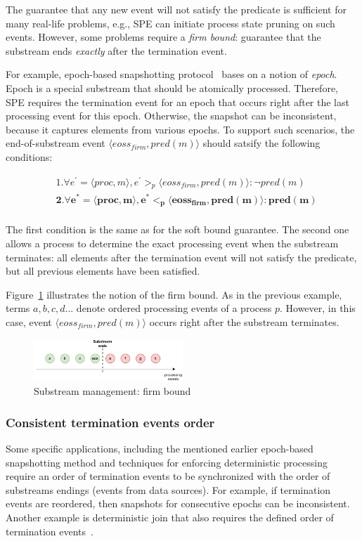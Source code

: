 The guarantee that any new event will not satisfy the predicate is sufficient for many real-life problems, e.g., SPE can initiate process state pruning on such events. However, some problems require a {\em firm bound}: guarantee that the substream ends {\em exactly} after the termination event. 

For example, epoch-based snapshotting protocol~\cite{2015arXiv150608603C, jacques2016consistent} bases on a notion of {\em epoch}. Epoch is a special substream that should be atomically processed. Therefore, SPE requires the termination event for an epoch that occurs right after the last processing event for this epoch. Otherwise, the snapshot can be inconsistent, because it captures elements from various epochs. To support such scenarios, the end-of-substream event $\langle eoss_{firm}, pred(m)\rangle$ should satsify the following conditions:

\begin{align*}
&1. \forall e^{'} = \langle proc,m\rangle, e^{'} >_p \langle eoss_{firm}, pred(m)\rangle : \neg pred(m) \\
&\boldsymbol{2. \forall e^{*} = \langle proc,m\rangle, e^{*} <_p \langle eoss_{firm}, pred(m)\rangle : pred(m)} \\
\end{align*}

The first condition is the same as for the soft bound guarantee. The second one allows a process to determine the exact processing event when the substream terminates: all elements after the termination event will not satisfy the predicate, but all previous elements have been satisfied. 

Figure~\ref{strict_guarantees} illustrates the notion of the firm bound. As in the previous example, terms $a,b,c,d...$ denote ordered processing events of a process $p$. However, in this case, event $\langle eoss_{firm}, pred(m)\rangle$ occurs right after the substream terminates.

\begin{figure}[htbp]
  \centering
  \includegraphics[width=0.50\textwidth]{pics/strict-guarantee.pdf}
  \caption{Substream management: firm bound}
  \label{strict_guarantees}
\end{figure}

\subsubsection{Consistent termination events order}
Some specific applications, including the mentioned earlier epoch-based snapshotting method and techniques for enforcing deterministic processing~\cite{we2018adbis} require an order of termination events to be synchronized with the order of substreams endings (events from data sources). For example, if termination events are reordered, then snapshots for consecutive epochs can be inconsistent. Another example is deterministic join that also requires the defined order of termination events~\cite{gulisano2016scalejoin}.

